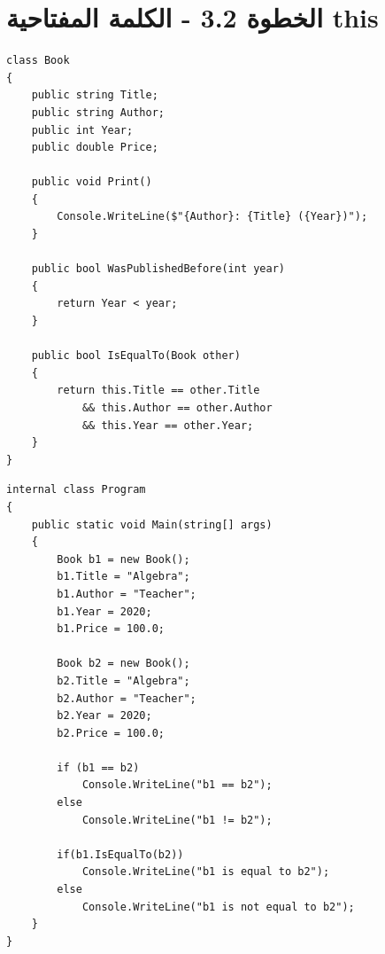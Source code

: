 \documentclass[11pt]{article}
\begin{document}
\section*{الخطوة 3.2 - الكلمة المفتاحية \textenglish{this}}
\begin{boxExample}
\begin{english}
\begin{verbatim}
class Book
{
    public string Title;
    public string Author;
    public int Year;
    public double Price;

    public void Print()
    {
        Console.WriteLine($"{Author}: {Title} ({Year})");
    }

    public bool WasPublishedBefore(int year)
    {
        return Year < year;
    }

    public bool IsEqualTo(Book other)
    {
        return this.Title == other.Title
            && this.Author == other.Author
            && this.Year == other.Year;
    }
}
\end{verbatim}
\end{english}
\end{boxExample}
\begin{boxExample}
\begin{english}
\begin{verbatim}
internal class Program
{
    public static void Main(string[] args)
    {
        Book b1 = new Book();
        b1.Title = "Algebra";
        b1.Author = "Teacher";
        b1.Year = 2020;
        b1.Price = 100.0;

        Book b2 = new Book();
        b2.Title = "Algebra";
        b2.Author = "Teacher";
        b2.Year = 2020;
        b2.Price = 100.0;

        if (b1 == b2)
            Console.WriteLine("b1 == b2");
        else
            Console.WriteLine("b1 != b2");

        if(b1.IsEqualTo(b2))
            Console.WriteLine("b1 is equal to b2");
        else
            Console.WriteLine("b1 is not equal to b2");
    }
}
\end{verbatim}
\end{english}
\end{boxExample}

\clearpage
\end{document}
